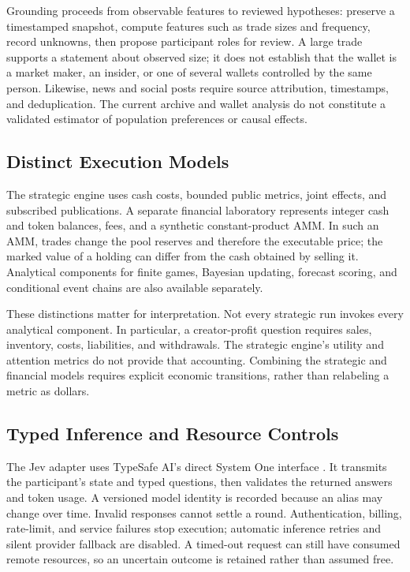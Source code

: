 Grounding proceeds from observable features to reviewed hypotheses: preserve
a timestamped snapshot, compute features such as trade sizes and frequency,
record unknowns, then propose participant roles for review. A large trade
supports a statement about observed size; it does not establish that the
wallet is a market maker, an insider, or one of several wallets controlled by
the same person. Likewise, news and social posts require source attribution,
timestamps, and deduplication. The current archive and wallet analysis do not
constitute a validated estimator of population preferences or causal effects.

\subsection{Distinct Execution Models}
The strategic engine uses cash costs, bounded public metrics, joint effects,
and subscribed publications. A separate financial laboratory represents
integer cash and token balances, fees, and a synthetic constant-product AMM.
In such an AMM, trades change the pool reserves and therefore the executable
price; the marked value of a holding can differ from the cash obtained by
selling it. Analytical components for finite games, Bayesian updating,
forecast scoring, and conditional event chains are also available separately.

These distinctions matter for interpretation. Not every strategic run invokes
every analytical component. In particular, a creator-profit question requires
sales, inventory, costs, liabilities, and withdrawals. The strategic engine's
utility and attention metrics do not provide that accounting. Combining the
strategic and financial models requires explicit economic transitions, rather
than relabeling a metric as dollars.

\subsection{Typed Inference and Resource Controls}
The Jev adapter uses TypeSafe AI's direct System One interface
\cite{typesafeapi}. It transmits the participant's state and typed questions,
then validates the returned answers and token usage. A versioned model identity
is recorded because an alias may change over time. Invalid responses cannot
settle a round. Authentication, billing, rate-limit, and service failures stop
execution; automatic inference retries and silent provider fallback are disabled.
A timed-out request can still have consumed remote resources, so an uncertain
outcome is retained rather than assumed free.

